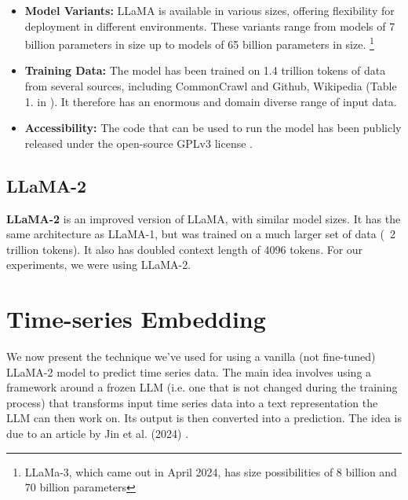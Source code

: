 \begin{itemize}
	\item \textbf{Model Variants:} LLaMA is available in various sizes, offering flexibility for deployment in different environments. These variants range from models of 7 billion parameters in size up to models of 65 billion parameters in size. \footnote{LLaMa-3, which came out in April 2024, has size possibilities of 8 billion and 70 billion parameters}

	\item \textbf{Training Data:} The model has been trained on 1.4 trillion tokens of data from several sources, including CommonCrawl and Github, Wikipedia (Table 1. in \cite{llama}). It therefore has an enormous and domain diverse range of input data.


	\item \textbf{Accessibility:} The code that can be used to run the model has been publicly released under the open-source GPLv3 license \cite{llama_code}.
\end{itemize}

\subsection{LLaMA-2}
\textbf{LLaMA-2} \cite{llama2} is an improved version of LLaMA, with similar model sizes. It has the same architecture as LLaMA-1, but was trained on a much larger set of data (~2 trillion tokens). It also has doubled context length of 4096 tokens. For our experiments, we were using LLaMA-2.

\section{Time-series Embedding}
We now present the technique we've used for using a vanilla (not fine-tuned) LLaMA-2 model to predict time series data.
The main idea involves using a framework around a frozen LLM (i.e. one that is not changed during the training process) that transforms input time series data into a text representation the LLM can then work on. Its output is then converted into a prediction. The idea is due to an article by Jin et al. (2024) \cite{reprogramming_llm}.

